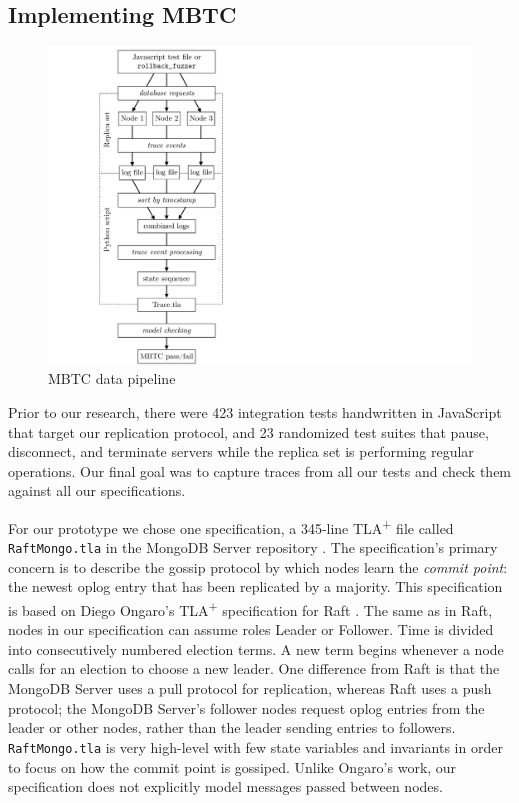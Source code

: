 \documentclass{vldb}
\begin{document}
\subsection{Implementing MBTC}
\label{subsec:mbtc_solution}

\begin{figure}[t]
{\centering
\includegraphics[trim=120pt 0 600pt 0,clip,width=0.7\linewidth]{MBTC-pipeline.pdf}
\par}
\caption{MBTC data pipeline}
\label{figure:MBTC-pipeline}
\end{figure}

Prior to our research, there were 423 integration tests handwritten in JavaScript that target our replication protocol, and 23 randomized test suites that pause, disconnect, and terminate servers while the replica set is performing regular operations. 
Our final goal was to capture traces from all our tests and check them against all our specifications.

For our prototype we chose one specification, a 345-line TLA\textsuperscript{+} file called \texttt{RaftMongo.tla} in the MongoDB Server repository \cite{MongoGitHub}.
The specification's primary concern is to describe the gossip protocol by which nodes learn the \textit{commit point}: the newest oplog entry that has been replicated by a majority.
This specification is based on Diego Ongaro's TLA\textsuperscript{+} specification for Raft \cite{Ongaro14TLA+Raft}.
The same as in Raft, nodes in our specification can assume roles Leader or Follower. Time is divided into consecutively numbered election terms. A new term begins whenever a node calls for an election to choose a new leader.
One difference from Raft is that the MongoDB Server uses a pull protocol for replication, whereas Raft uses a push protocol; the MongoDB Server's follower nodes request oplog entries from the leader or other nodes, rather than the leader sending entries to followers.
\texttt{RaftMongo.tla} is very high-level with few state variables and invariants in order to focus on how the commit point is gossiped. 
Unlike Ongaro's work, our specification does not explicitly model messages passed between nodes.
\end{document}
